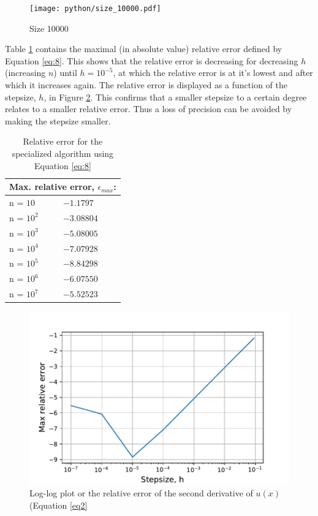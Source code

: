 \documentclass{article}
\begin{document}
\begin{figure}[h]
    \centering
    \texttt{[image: python/size\_10000.pdf]}
    \caption{Size 10000}
    \label{fig:4}
\end{figure}

Table \ref{tab:2} contains the maximal (in absolute value) relative error defined by Equation \ref{eq:8}. This shows that the relative error is decreasing for decreasing $h$ (increasing $n$) until $h = 10^{-5}$, at which the relative error is at it's lowest and after which it increases again. The relative error is displayed as a function of the stepsize, $h$, in Figure \ref{fig:re}. This confirms that a smaller stepsize to a certain degree relates to a smaller relative error. Thus a loss of precision can be avoided by making the stepsize smaller. 

\begin{table}[]
\centering
\begin{tabular}{ll}
\multicolumn{2}{c}{\textbf{Max. relative error, $\epsilon_{max}$:}} \\ \hline
n = $10$                                  & $-1.1797$                                \\
n = $10^2$                                & $-3.08804$                               \\
n = $10^3$                                & $-5.08005$                               \\
n = $10^4$                                & $-7.07928$                               \\
n = $10^5$                                & $-8.84298$                                \\
n = $10^6$                                & $-6.07550$                               \\
n = $10^7$                                & $-5.52523$                              
\end{tabular}
\label{tab:2}
\caption{Relative error for the specialized algorithm using Equation \ref{eq:8}}
\end{table}


\begin{figure}[h]
    \centering
    \includegraphics[width =12cm]{python/relative_error.pdf}
    \caption{Log-log plot or the relative error of the second derivative of $u(x)$ (Equation \ref{eq2}}
    \label{fig:re}
\end{figure}
\end{document}
